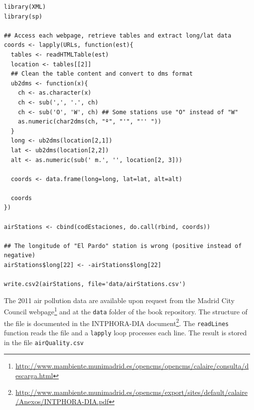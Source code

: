 \documentclass[smallroyalvopaper]{memoir}
\begin{document}

\lstset{language=R,numbers=none}
\begin{lstlisting}
library(XML)
library(sp)

## Access each webpage, retrieve tables and extract long/lat data
coords <- lapply(URLs, function(est){
  tables <- readHTMLTable(est)
  location <- tables[[2]]
  ## Clean the table content and convert to dms format
  ub2dms <- function(x){
    ch <- as.character(x)
    ch <- sub(',', '.', ch) 
    ch <- sub('O', 'W', ch) ## Some stations use "O" instead of "W"
    as.numeric(char2dms(ch, "º", "'", "'' "))
  }
  long <- ub2dms(location[2,1])
  lat <- ub2dms(location[2,2])
  alt <- as.numeric(sub(' m.', '', location[2, 3]))

  coords <- data.frame(long=long, lat=lat, alt=alt)

  coords
})

airStations <- cbind(codEstaciones, do.call(rbind, coords))

## The longitude of "El Pardo" station is wrong (positive instead of negative)
airStations$long[22] <- -airStations$long[22]

write.csv2(airStations, file='data/airStations.csv')
\end{lstlisting}

The 2011 air pollution data are available upon request from the Madrid
City Council webpage\footnote{\url{http://www.mambiente.munimadrid.es/opencms/opencms/calaire/consulta/descarga.html}} and at the \texttt{data} folder of the book
repository. The structure of the file is documented in the
INTPHORA-DIA document\footnote{\url{http://www.mambiente.munimadrid.es/opencms/export/sites/default/calaire/Anexos/INTPHORA-DIA.pdf}}. The \texttt{readLines} function reads the file
and a \texttt{lapply} loop processes each line. The result is stored in the
file \texttt{airQuality.csv}

\end{document}
